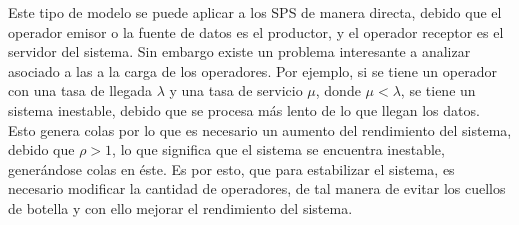 Este tipo de modelo se puede aplicar a los SPS de manera directa, debido que el operador emisor o la fuente de datos es el productor, y el operador receptor es el servidor del sistema. Sin embargo existe un problema interesante a analizar asociado a las a la carga de los operadores. Por ejemplo, si se tiene un operador con una tasa de llegada $\lambda$ y una tasa de servicio $\mu$, donde $\mu < \lambda$, se tiene un sistema inestable, debido que se procesa más lento de lo que llegan los datos. Esto genera colas por lo que es necesario un aumento del rendimiento del sistema, debido que $\rho > 1 $, lo que significa que el sistema se encuentra inestable, generándose colas en éste. Es por esto, que para estabilizar el sistema, es necesario modificar la cantidad de operadores, de tal manera de evitar los cuellos de botella y con ello mejorar el rendimiento del sistema.
